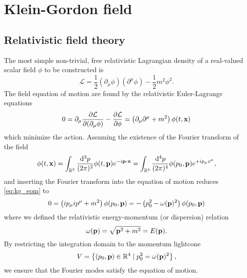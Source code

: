 \section{Klein-Gordon field}

\subsection{Relativistic field theory}

The most simple non-trivial, free relativistic Lagrangian density of a real-valued scalar field $\phi$ to be constructed is
\begin{equation}
	\mathcal{L}
	=
	\frac{1}{2}
	\left(\partial_\mu\phi\right)
	\left(\partial^\mu\phi\right)
	-
	\frac{1}{2}
	m^2\phi^2
	\label{eq:kg_lagrangian}.
\end{equation}
The field equation of motion are found by the relativistic Euler-Lagrange equations
\begin{equation}
	0
	=
	\partial_\mu\pdv{\mathcal{L}}{(\partial_\mu\phi)}
	-
	\pdv{\mathcal{L}}{\phi}
	=
	\left(\partial_\mu\partial^\mu+m^2\right)
	\phi(t,\vb{x})
	\label{eq:kg_eom}
\end{equation}
which minimize the action.
Assuming the existence of the Fourier transform of the field~\cite[p.~341]{Cohen2019}
\begin{equation}
	\phi(t,\vb{x})
	=
	\int_{\mathbb{R}^3}\frac{\dd[3]{p}}{(2\pi)^3}
	\phi(t,\vb{p})e^{-i\vb{p}\vdot\vb{x}}
	=
	\int_{\mathbb{R}^4}\frac{\dd[4]{p}}{(2\pi)^4}
	\phi(p_0,\vb{p})e^{+ip_\mu x^\mu}
	\label{eq:kg_ft_naive},
\end{equation}
and inserting the Fourier transform into the equation of motion reduces \cref{eq:kg_eom} to
\begin{equation}
	0
	=
	\left(
		ip_\mu ip^\mu
		+
		m^2
	\right)
	\phi(p_0,\vb{p})
	=
	-
	\left(
		p_0^2
		-
		\omega(\vb{p})^2
	\right)
	\phi(p_0,\vb{p})
	\label{eq:kg_eom_ft}
\end{equation}
where we defined the relativistic energy-momentum (or dispersion) relation
\begin{equation}
	\omega(\vb{p})
	=
	\sqrt{\vb{p}^2+m^2}
	=
	E(\vb{p})
	\label{eq:energy_momentum_relation}.
\end{equation}
By restricting the integration domain to the momentum lightcone
\begin{equation}
	V
	=
	\left\{
		(p_0,\vb{p})\in\mathbb{R}^4
		\mid
		p_0^2=\omega(\vb{p})^2
	\right\}
	\label{eq:momentum_lightcone},
\end{equation}
we ensure that the Fourier modes satisfy the equation of motion.
